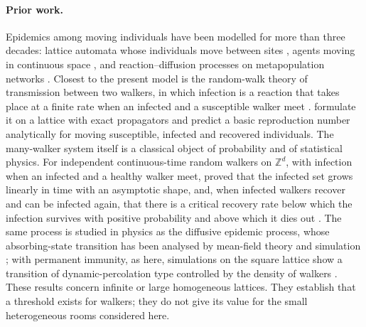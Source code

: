 \paragraph{Prior work.}
Epidemics among moving individuals have been modelled for more than three decades: lattice automata whose
individuals move between sites \citep{boccara1992automata,rhodes1996persistence}, agents moving in continuous
space \citep{gonzalez2004scaling,frasca2006dynamical,buscarino2008disease}, and reaction--diffusion processes
on metapopulation networks \citep{colizza2007reaction,belik2011natural,wang2014spatial}.
Closest to the present model is the random-walk theory of transmission between two walkers, in which infection
is a reaction that takes place at a finite rate when an infected and a susceptible walker meet
\citep{kenkre2014theory,sugaya2018analysis,kenkre2021theory}. \citet{giuggioli2022spatio} formulate it on a
lattice with exact propagators \citep{giuggioli2020exact,sarvaharman2023particle} and predict a basic
reproduction number analytically for moving susceptible, infected and recovered individuals.
The many-walker system itself is a classical object of probability and of statistical physics. For
independent continuous-time random walkers on $\mathbb{Z}^d$, with infection when an infected and a healthy
walker meet, \citet{kesten2005spread,kesten2008shape} proved that the infected set grows linearly in time with
an asymptotic shape, and, when infected walkers recover and can be infected again, that there is a critical
recovery rate below which the infection survives with positive probability and above which it dies out
\citep{kesten2006phase}. The same process is studied in physics as the diffusive epidemic process, whose
absorbing-state transition has been analysed by mean-field theory and simulation \citep{maia2007diffusive};
with permanent immunity, as here, simulations on the square lattice show a transition of dynamic-percolation
type controlled by the density of walkers \citep{carvalho2025generalized}. These results concern infinite or
large homogeneous lattices. They establish that a threshold exists for walkers; they do not give its value
for the small heterogeneous rooms considered here.

